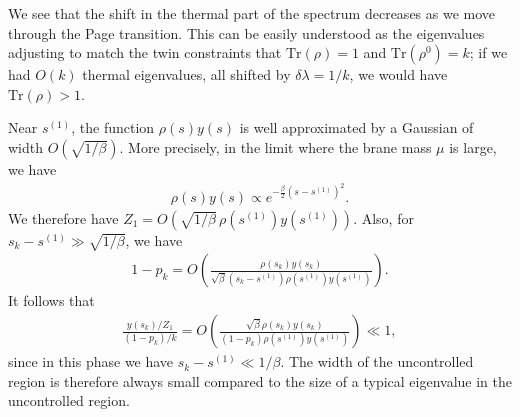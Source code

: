 \documentclass[12pt]{article}
\newcommand{\smax}{s_k}
\numberwithin{equation}{section}
\def\Tr{\text{Tr}}
\begin{document}
We see that the shift in the thermal part of the spectrum decreases as we move through the Page transition. This can be easily understood as the eigenvalues adjusting to match the twin constraints that $\Tr(\rho) = 1$ and $\Tr(\rho^0) = k$; if we had $O(k)$ thermal eigenvalues, all shifted by $\delta \lambda = 1/k$, we would have $\Tr(\rho) > 1$.

Near $s^{(1)}$, the function $\rho(s) y(s)$ is well approximated by a Gaussian of width $O(\sqrt{1/\beta})$. More precisely, in the limit where the brane mass $\mu$ is large, we have
\begin{align}
\rho(s)y(s) \propto e^{- \frac{\beta}{2} (s -s^{(1)})^2}.
\end{align}
We therefore have $Z_1 = O(\sqrt{1/\beta}\, \rho(s^{(1)}) y(s^{(1)}))$. Also, for $\smax - s^{(1)} \gg \sqrt{1/\beta}$, we have
\begin{align}
1 - p_k = O\left( \frac{\rho(\smax) y(\smax)}{\sqrt{\beta}(\smax - s^{(1)})\rho(s^{(1)}) y(s^{(1)})}\right).
\end{align}
It follows that
\begin{align}
\frac{y(\smax)/Z_1}{(1-p_k)/ k}  = O\left(\frac{\sqrt{\beta}\rho(\smax) y(\smax)}{(1-p_k) \rho(s^{(1)}) y(s^{(1)})}\right) \ll 1,
\end{align}
since in this phase we have $\smax - s^{(1)} \ll 1/\beta$. The width of the uncontrolled region is therefore always small compared to the size of a typical eigenvalue in the uncontrolled region.
\end{document}

